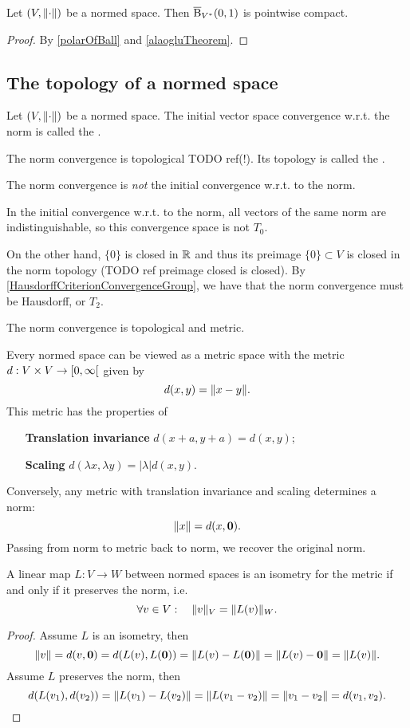 \begin{proposition}
Let $\sSet{V, \norm{\cdot}}$ be a normed space. Then $\operatorname{\overline{B}}_{{V}^*}(0, 1)$ is pointwise compact.
\end{proposition}
\begin{proof}
By \ref{polarOfBall} and \ref{alaogluTheorem}.
\end{proof}

\subsection{The topology of a normed space}
\begin{definition}
Let $\sSet{V,\norm{\cdot}}$ be a normed space. The initial vector space convergence w.r.t. the norm is called the .
\end{definition}
The norm convergence is topological TODO ref(!). Its topology is called the .

\begin{example}
The norm convergence is \emph{not} the initial convergence w.r.t. to the norm.

In the initial convergence w.r.t. to the norm, all vectors of the same norm are indistinguishable, so this convergence space is not $T_0$.

On the other hand, $\{0\}$ is closed in $\mathbb{R}$ and thus its preimage $\{0\} \subset V$ is closed in the norm topology (TODO ref preimage closed is closed). By \ref{HausdorffCriterionConvergenceGroup}, we have that the norm convergence must be Hausdorff, or $T_2$.
\end{example}


\begin{proposition}
The norm convergence is topological and metric.

Every normed space can be viewed as a metric space with the metric $d:V\times V \to \interval[co]{0,\infty}$ given by
\[ d(x,y) = \lVert x-y\rVert. \]
This metric has the properties of
\begin{itemize}[leftmargin=6cm]
\item[\textbf{Translation invariance}] $d(x+a, y+a) = d(x,y)$;
\item[\textbf{Scaling}] $d(\lambda x, \lambda y) = |\lambda|d(x,y)$.
\end{itemize}
Conversely, any metric with translation invariance and scaling determines a norm:
\[ \lVert x\rVert = d(x,\boldsymbol{\mathrm{0}}). \]
Passing from norm to metric back to norm, we recover the original norm.
\end{proposition}
\begin{lemma}
A linear map $L:V\to W$ between normed spaces is an isometry for the metric \textup{if and only if} it preserves the norm, i.e.\
\[ \forall v\in V: \quad \lVert v\rVert_V = \lVert L(v)\rVert_W. \]
\end{lemma}
\begin{proof}
Assume $L$ is an isometry, then
\[ \lVert v\rVert = d(v,\boldsymbol{\mathrm{0}}) = d(L(v),L(\boldsymbol{\mathrm{0}})) = \lVert L(v) - L(\boldsymbol{\mathrm{0}})\rVert = \lVert L(v) - \boldsymbol{\mathrm{0}}\rVert = \lVert L(v)\rVert. \]
Assume $L$ preserves the norm, then
\[ d(L(v_1), d(v_2)) = \lVert L(v_1)-L(v_2)\rVert = \lVert L(v_1-v_2)\rVert = \lVert v_1-v_2\rVert = d(v_1,v_2). \]
\end{proof}

